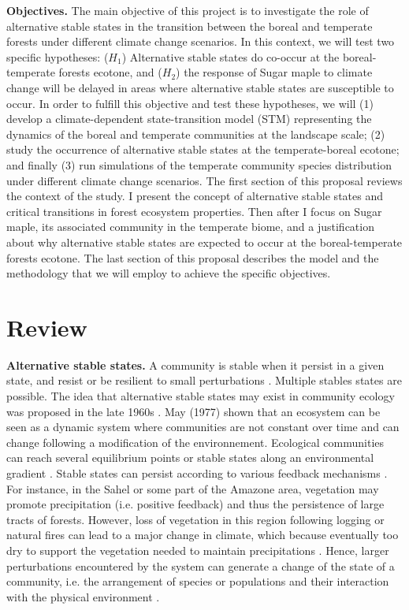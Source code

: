 \textbf{Objectives.} The main objective of this project is to investigate the
role of alternative stable states in the transition between the boreal and temperate
forests under different climate change scenarios. In this context, we will
test two specific hypotheses: ($H_1$) Alternative stable states do co-occur at
the boreal-temperate forests ecotone, and ($H_2$) the response of Sugar maple
to climate change will be delayed in areas where alternative stable states are
susceptible to occur. In order to fulfill this objective and test these
hypotheses, we will (1) develop a climate-dependent state-transition model
(STM) representing the dynamics of the boreal and temperate communities at the
landscape scale; (2) study the occurrence of alternative stable states at the
temperate-boreal ecotone; and finally (3) run simulations of the temperate
community species distribution under different climate change scenarios. The
first section of this proposal reviews the context of the study. I present
the concept of alternative stable states and critical transitions in forest
ecosystem properties. Then after I focus on Sugar maple, its associated
community in the temperate biome, and a justification about why alternative
stable states are expected to occur at the boreal-temperate forests ecotone.
The last section of this proposal describes the model and the methodology that
we will employ to achieve the specific objectives.

\section{Review} 

\textbf{Alternative stable states.} A community is stable when it persist in a
given state, and resist or be resilient to small perturbations \cite{Filbee-Dexter2013}. 
Multiple stables states are possible. The idea that alternative
stable states may exist in community ecology was proposed in the late 1960s
\cite{Scheffer2001,Society2014a}.  May (1977) \cite{May1977} shown that an
ecosystem can be seen as a dynamic system where communities are not constant
over time and can change following a modification of the environnement.
Ecological communities can reach several equilibrium points or stable states
along an environmental gradient \cite{May1977}. Stable states can persist
according to various feedback mechanisms \cite{Filbee-Dexter2013}. For
instance, in the Sahel or some part of the Amazone area, vegetation may
promote precipitation (i.e. positive feedback) and thus the persistence of
large tracts of forests. However, loss of vegetation  in this region following
logging or natural fires can lead to a major change in climate, which because
eventually too dry to support the vegetation needed to maintain precipitations
\cite{scheffer2009critical}. Hence, larger perturbations encountered by the
system can generate a change of the state of a community, i.e. the arrangement
of species or populations and their interaction with the physical environment
\cite {Filbee-Dexter2013}.\\

